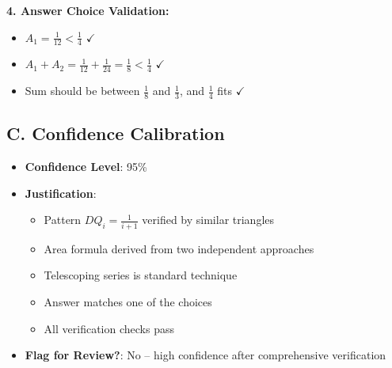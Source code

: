 \documentclass[]{article}
\begin{document}
\begin{verificationbox}
\textbf{4. Answer Choice Validation:}
\begin{itemize}
    \item $A_1 = \frac{1}{12} < \frac{1}{4}$ $\checkmark$
    \item $A_1 + A_2 = \frac{1}{12} + \frac{1}{24} = \frac{1}{8} < \frac{1}{4}$ $\checkmark$
    \item Sum should be between $\frac{1}{8}$ and $\frac{1}{3}$, and $\frac{1}{4}$ fits $\checkmark$
\end{itemize}

\subsection*{C. Confidence Calibration}
\begin{itemize}[leftmargin=*]
    \item \textbf{Confidence Level}: 95\%
    \item \textbf{Justification}:
    \begin{itemize}
        \item Pattern $DQ_i = \frac{1}{i+1}$ verified by similar triangles
        \item Area formula derived from two independent approaches
        \item Telescoping series is standard technique
        \item Answer matches one of the choices
        \item All verification checks pass
    \end{itemize}
    \item \textbf{Flag for Review?}: No -- high confidence after comprehensive verification
\end{itemize}
\end{verificationbox}
\end{document}
